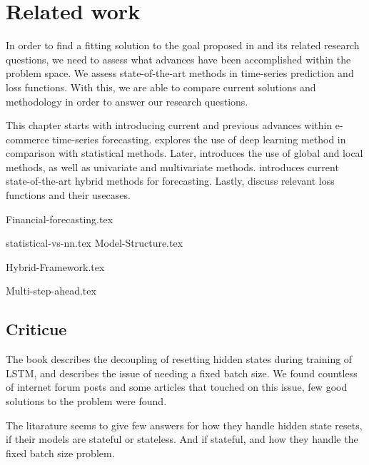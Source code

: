 \chapter{Related work}
\label{section:RelatedWork}

In order to find a fitting solution to the goal proposed in  and its related research questions,
we need to assess what advances have been accomplished within the problem space.
We assess state-of-the-art methods in time-series prediction and loss functions.
With this, we are able to compare current solutions and methodology in order to answer our research questions.

This chapter starts with  introducing current and previous advances within e-commerce time-series forecasting.
 explores the use of deep learning method in comparison with statistical methods.
Later,  introduces the use of global and local methods, as well as univariate and multivariate methods.
 introduces current state-of-the-art hybrid methods for forecasting.
Lastly,  discuss relevant loss functions and their usecases.



{Financial-forecasting.tex}

{statistical-vs-nn.tex}
{Model-Structure.tex}

{Hybrid-Framework.tex}

{Multi-step-ahead.tex}

\section*{Criticue}
The book \cite{Bharadi2021} describes the decoupling of resetting hidden
states during training of LSTM, and describes the issue of
needing a fixed batch size. We found countless of internet forum posts
and some articles that touched on this issue, few good solutions
to the problem were found.

The litarature seems to give few answers for how they handle hidden state
resets, if their models are stateful or stateless. And if stateful,
and how they handle the fixed batch size problem.

